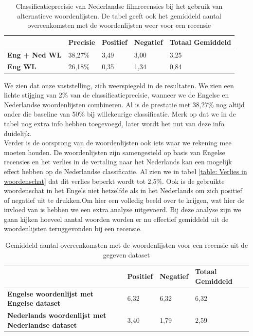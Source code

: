 \begin{table}[h]
\centering
\begin{tabular}{l|l|l|l|l|}
\cline{2-5}
                                         & {\bf Precisie} & {\bf Positief} & {\bf Negatief} & {\bf Totaal Gemiddeld} \\ \hline
\multicolumn{1}{|l|}{{\bf Eng + Ned WL}} & 38,27\%        & 3,49           & 3,00           & 3,25            \\ \hline
\multicolumn{1}{|l|}{{\bf Eng WL}}       & 26,18\%        & 0,35           & 1,34           & 0,84            \\ \hline
\end{tabular}
\caption{Classificatieprecisie van Nederlandse filmrecensies bij het gebruik van alternatieve woordenlijsten. De tabel geeft ook het gemiddeld aantal overeenkomsten met de woordenlijsten weer voor een recensie }
\label{altwoordenlijsten}
\end{table}

We zien dat onze vaststelling, zich weerspiegeld in de resultaten. We zien een lichte stijging van 2\% van de classificatieprecisie, wanneer we de Engelse en Nederlandse woordenlijsten combineren. Al is de prestatie met 38,27\% nog altijd onder die baseline van 50\% bij willekeurige classificatie. Merk op dat we in de tabel nog extra info hebben toegevoegd, later wordt het nut van deze info duidelijk.\\

Verder is de oorsprong van de woordenlijsten ook iets waar we rekening mee moeten houden. De woordenlijsten zijn samengesteld op basis van Engelse recensies en het verlies in de vertaling naar het Nederlands kan een mogelijk effect hebben op de Nederlandse classificatie. Al zien we in tabel \ref{table: Verlies in woordenschat} dat dit verlies beperkt wordt tot 2,5\%. Ook is de gebruikte woordenschat in het Engels niet hetzelfde als in het Nederlands om zich positief of negatief uit te drukken.Om hier een volledig beeld over te krijgen, wat hier de invloed van is hebben we een extra analyse uitgevoerd. Bij deze analyse zijn we gaan kijken hoeveel aantal woorden worden er nu effectief gemiddeld uit de woordenlijsten teruggevonden bij een recensie.\\

\begin{table}[h]
\centering
\begin{tabular}{l|l|l|l|}
\cline{2-4}
                                                 & {\bf Positief} & {\bf Negatief} & {\bf Totaal Gemiddeld} \\ \hline
\multicolumn{1}{|l|}{{\bf Engelse woordenlijst met Engelse dataset}} & 6,32           & 6,32           & 6,32            \\ \hline
\multicolumn{1}{|l|}{{\bf Nederlands woordenlijst met Nederlandse dataset}}           & 3,40           & 1,79           & 2,59            \\ \hline
\end{tabular}
\caption{Gemiddeld aantal overeenkomsten met de woordenlijsten voor een recensie uit de gegeven dataset}
\end{table}

